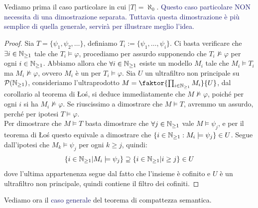 Vediamo prima il caso particolare in cui $|T| = \aleph_0$. \textcolor{MidnightBlue}{Questo caso particolare NON necessita di una dimostrazione separata.
Tuttavia questa dimostrazione è più semplice di quella generale, servirà per illustrare meglio l'idea.}

\begin{proof}
    Sia $T = \{\psi_1,\psi_2,\ldots\}$, definiamo $T_i := \{\psi_1,\ldots,\psi_i\}$. Ci basta verificare che $\exists i \in \mathbb N_{\geq 1}$ tale che $T_i \models \varphi$, procediamo per assurdo supponendo che $T_i \not\models \varphi$ per ogni $i \in \mathbb N_{\geq 1}$.
    Abbiamo allora che $\forall i \in \mathbb N_{\geq 1}$ esiste un modello $M_i$ tale che $M_i \models T_i$ ma $M_i \not\models \varphi$, ovvero $M_i$ è un  per $T_i \models \varphi$. Sia $U$ un ultrafiltro non principale su $\mathcal{P}(\mathbb N_{\geq 1})$, consideriamo l'ultraprodotto $M = \faktor{\prod_{i \in \NN_{\geq 1}} M_i}{U}$,
    dal corollario al teorema di Łoś, si deduce immediatamente che $M \not\models \varphi$, poiché per ogni $i$ si ha $M_i \not\models \varphi$. Se riuscissimo a dimostrare che $M \models T$, avremmo un assurdo, perché per ipotesi $T \models \varphi$.\\
    Per dimostrare che $M \models T$ basta dimostrare che $\forall j \in \mathbb N_{\geq 1}$ vale $M \models \psi_j$, e per il teorema di Łoś questo equivale a dimostrare che $\{i \in \mathbb N_{\geq 1} : M_i \models \psi_j\} \in U$.
    Segue dall'ipotesi che $M_k \models \psi_j$ per ogni $k \geq j$, quindi:
    \[ \{i \in \mathbb N_{\geq 1} | M_i \models \psi_j\} \supseteq \{i \in \mathbb N_{\geq 1} | i \geq j\} \in U
    \]
    dove l'ultima appartenenza segue dal fatto che l'insieme è cofinito e $U$ è un ultrafiltro non principale, quindi contiene il filtro dei cofiniti.
\end{proof}

Vediamo ora il \textcolor{MidnightBlue}{caso generale} del teorema di compattezza semantica.

